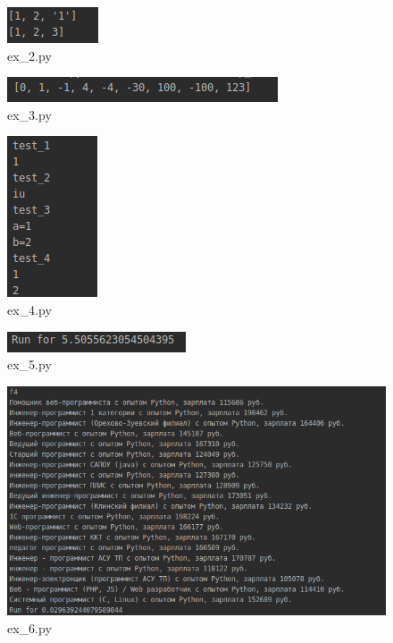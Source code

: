 \documentclass{article}
\begin{document}
\begin{figure}[h!]
    \centering
    \includegraphics{ex2.png}
    \caption{ex\_2.py}
    \label{fig: ex2}
\end{figure}

\begin{figure}[h!]
    \centering
    \includegraphics[width=\textwidth]{ex3.png}
    \caption{ex\_3.py}
    \label{fig: ex3}
\end{figure}

\begin{figure}[h!]
    \centering
    \includegraphics{ex4.png}
    \caption{ex\_4.py}
    \label{fig: ex4}
\end{figure}

\begin{figure}[h!]
    \centering
    \includegraphics[width=\textwidth]{ex5.png}
    \caption{ex\_5.py}
    \label{fig: ex5}
\end{figure}
\begin{figure}[h!]
    \centering
    \includegraphics[width=\textwidth]{ex6.png}
    \caption{ex\_6.py}
    \label{fig: ex6}
\end{figure}
\end{document}
